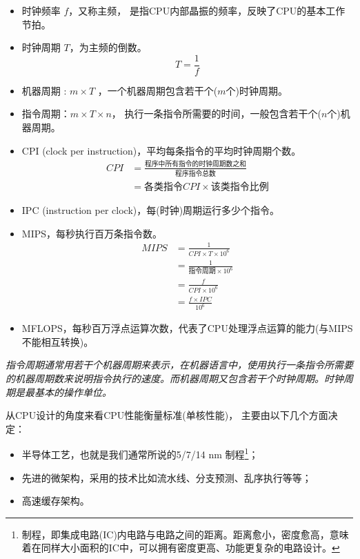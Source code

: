 \documentclass[final]{cvpr}
\begin{document}
\begin{itemize}
\item 时钟频率 $f$，又称主频，
      是指CPU内部晶振的频率，反映了CPU的基本工作节拍。
\item 时钟周期 $T$，为主频的倒数。
$$
T=\frac{1}{f}
$$
\item 机器周期 : $m\times T$ ，一个机器周期包含若干个($m$个)时钟周期。
\item 指令周期：$m\times T \times n$， 执行一条指令所需要的时间，一般包含若干个($n$个)机器周期。
\item CPI (clock per instruction)，平均每条指令的平均时钟周期个数。
\begin{equation*}
\begin{aligned}
CPI & =  \frac{\text{程序中所有指令的时钟周期数之和}}{\text{程序指令总数}}\\
    & =  \text{各类指令}CPI \times \text{该类指令比例}
\end{aligned}
\end{equation*}
\item IPC (instruction per clock)，每(时钟)周期运行多少个指令。
\item MIPS，每秒执行百万条指令数。
\begin{equation*}
\begin{aligned}
MIPS & =  \frac{1}{CPI\times T\times 10^6}\\
     & =  \frac{1}{\text{指令周期}\times 10^6}\\
     & =  \frac{f}{CPI\times 10^6}\\
     & =  \frac{f\times IPC}{10^6}
\end{aligned}
\end{equation*}
\item MFLOPS，每秒百万浮点运算次数，代表了CPU处理浮点运算的能力(与MIPS不能相互转换)。
\end{itemize}

\textit{指令周期通常用若干个机器周期来表示，在机器语言中，使用执行一条指令所需要的机器周期数来说明指令执行的速度。而机器周期又包含若干个时钟周期。时钟周期是最基本的操作单位。}

从CPU设计的角度来看CPU性能衡量标准(单核性能)，
主要由以下几个方面决定：

\begin{itemize}
\item 半导体工艺，也就是我们通常所说的5/7/14 nm 制程\footnote{制程，即集成电路(IC)内电路与电路之间的距离。距离愈小，密度愈高，意味着在同样大小面积的IC中，可以拥有密度更高、功能更复杂的电路设计。}；
\item 先进的微架构，采用的技术比如流水线、分支预测、乱序执行等等；
\item 高速缓存架构。
\end{itemize}
\end{document}
